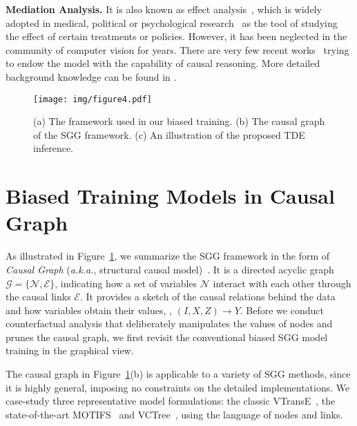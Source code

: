 \documentclass[10pt,twocolumn,letterpaper]{article}
\begin{document}
\noindent\textbf{Mediation Analysis.} It is also known as effect analysis~\cite{vanderweele2015explanation, Judea2018thebookofwhy}, which is widely adopted in medical, political or psychological research~\cite{richiardi2013mediation, keele2015statistics, dunn2015evaluation, mackinnon2007mediation, king2008political} as the tool of studying the effect of certain treatments or policies. However, it has been neglected in the community of computer vision for years. There are very few recent works~\cite{nair2019causal, kusner2017counterfactual, niu2020counterfactual, qi2019two, wang2020visual, yang2020deconfounded} trying to endow the model with the capability of causal reasoning. More detailed background knowledge can be found in \cite{pearl2016causal,Judea2018thebookofwhy, vanderweele2015explanation}. 

%
 



\begin{figure}[t]
   \begin{minipage}[b]{1.0\linewidth}
   \centerline{\texttt{[image: img/figure4.pdf]}}
   \end{minipage}
   \caption{(a) The framework used in our biased training. (b) The causal graph of the SGG framework. (c) An illustration of the proposed TDE inference.}
   \label{fig:4} \vspace{-0.2in}
\end{figure}

\section{Biased Training Models in Causal Graph}
\label{sec:biased_training}
As illustrated in Figure~\ref{fig:4}, we summarize the SGG framework in the form of \textit{Causal Graph} (\textit{a.k.a.}, structural causal model)~\cite{Judea2018thebookofwhy, pearl2000causality, pearl2016causal}. It is a directed acyclic graph $\mathcal{G}=\{\mathcal{N}, \mathcal{E}\}$, indicating how a set of variables $\mathcal{N}$ interact with each other through the causal links $\mathcal{E}$. It provides a sketch of the causal relations behind the data and how variables obtain their values, \eg, $(I,X,Z)\to Y$. Before we conduct counterfactual analysis that deliberately manipulates the values of nodes and prunes the causal graph, we first revisit the conventional biased SGG model training in the graphical view. 

The causal graph in Figure~\ref{fig:4}(b) is applicable to a variety of SGG methods, since it is highly general, imposing no constraints on the detailed implementations. We case-study three representative model formulations: the classic VTransE~\cite{zhang2017visual}, the state-of-the-art MOTIFS~\cite{zellers2018neural} and VCTree~\cite{tang2019learning}, using the language of nodes and links.
\end{document}
